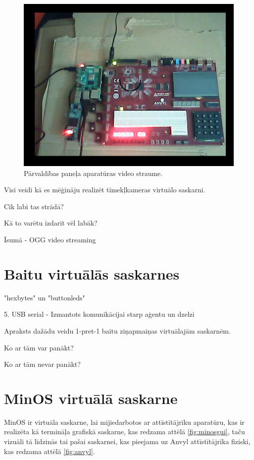 \begin{figure}[H]
    \includegraphics[width=0.9\linewidth]{assets/webcam-usage.png}
    \centering
    \caption{Pārvaldības paneļa aparatūras video straume.}
    \label{fig:hwstream}
\end{figure}

Visi veidi kā es mēģināju realizēt tīmekļkameras virtuālo saskarni.

Cik labi tas strādā?

Kā to varētu izdarīt vēl labāk?

Īsumā - OGG video streaming


\section{Baitu virtuālās saskarnes}
\label{sec:vinbytes}

"hexbytes" un "buttonleds"

5. USB serial - Izmantots komunikācijai starp aģentu un dzelzi


Apraksts dažādu veidu 1-pret-1 baitu ziņapmaiņas virtuālajām saskarnēm.

Ko ar tām var panākt?

Ko ar tām nevar panākt?

\section{MinOS virtuālā saskarne}
\label{sec:vinminos}

MinOS ir virtuāla saskarne, lai mijiedarbotos ar attīstītājrīku aparatūru, kas
ir realizēta kā termināļa grafiskā saskarne, kas redzama attēlā
\ref{fig:minosgui}, taču vizuāli tā līdzinās tai pašai saskarnei, kas pieejama
uz Anvyl attīstītājrīka fiziski, kas redzama attēlā \ref{fig:anvyl}. 

